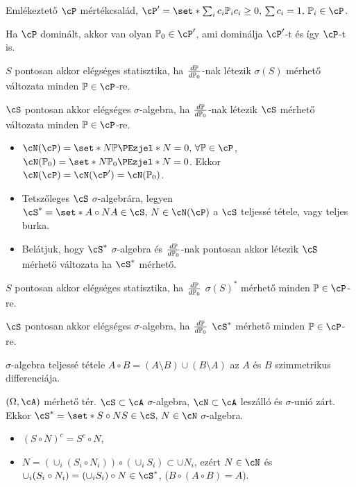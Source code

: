 \documentclass[aspectratio=169,notheorems,9pt,\option]{beamer}
\begin{document}
\begin{frame}{Emlékeztető}
  $\cP$ mértékcsalád, $\cP'=\set*{\sum_{i} c_i\P[i]}{c_i\geq0,\,\sum c_i=1,\,\P[i]\in\cP}$.
  \begin{proposition}
    Ha $\cP$ dominált, akkor van olyan $\P[0]\in\cP'$, ami dominálja $\cP'$-t és így $\cP$-t is.
  \end{proposition}
  \begin{proposition}
    $S$  pontosan akkor elégséges statisztika, 
    ha $\frac{d\P}{d\P[0]}$-nak létezik $\sigma(S)$ mérhető változata minden $\P\in\cP$-re.
 
    $\cS$  pontosan akkor elégséges $\sigma$-algebra, 
    ha $\frac{d\P}{d\P[0]}$-nak létezik $\cS$ mérhető változata minden $\P\in\cP$-re.
  \end{proposition}

  \begin{itemize}
    \item $\cN(\cP)=\set*{N}{\P{N}=0,\,\forall \P\in\cP}$, $\cN(\P[0])=\set*{N}{\P[0]{N}=0}$. 
    Ekkor $\cN(\cP)=\cN(\cP')=\cN(\P[0])$.
    \item Tetszőleges $\cS$ $\sigma$-algebrára, legyen 
    $\cS^*=\set*{A\circ N}{A\in\cS,\,N\in\cN(\cP)}$ a $\cS$ teljessé tétele, vagy teljes burka.
    \item Belátjuk, hogy $\cS^*$ $\sigma$-algebra és 
     $\frac{d\P}{d\P[0]}$-nak pontosan akkor létezik $\cS$ mérhető változata
    ha $\cS^*$ mérhető.
  \end{itemize}

  \begin{proposition}
    $S$  pontosan akkor elégséges statisztika, 
    ha $\frac{d\P}{d\P[0]}$  $\sigma(S)^*$ mérhető minden $\P\in\cP$-re.
 
    $\cS$  pontosan akkor elégséges $\sigma$-algebra, 
    ha $\frac{d\P}{d\P[0]}$  $\cS^*$ mérhető minden $\P\in\cP$-re.
  \end{proposition}

\end{frame}

\begin{frame}{$\sigma$-algebra teljessé tétele}
  $A\circ B=(A\setminus B)\cup(B\setminus A)$ az $A$ és $B$ szimmetrikus differenciája.
  \begin{proposition}
    $(\Omega,\cA)$ mérhető tér. $\cS\subset\cA$ $\sigma$-algebra, 
    $\cN\subset\cA$ leszálló és $\sigma$-unió zárt. Ekkor
    $\cS^*=\set*{S\circ N}{S\in\cS,\,N\in\cN}$ $\sigma$-algebra.
  \end{proposition}
  \begin{itemize}
    \item $(S\circ N)^c=S^c\circ N$,
    \item $N=(\cup_i (S_i\circ N_i))\circ (\cup_i S_i)\subset \cup N_i$, ezért $N\in\cN$ és
    $\cup_i (S_i\circ N_i)= (\cup_i S_i)\circ N\in\cS^*$, ($B\circ(A\circ B)=A$).
  \end{itemize}
\end{frame}
\end{document}
